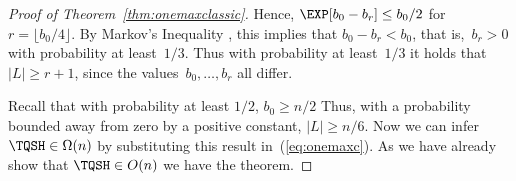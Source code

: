 \begin{proof}[Proof of Theorem~\ref{thm:onemaxclassic}]
Hence, $\EXP[b_0-b_r]\le b_0/2$ for~$r=\lfloor b_0/4\rfloor$. By
Markov's In\-equality \cite{MitzemacherU05}, this implies that
$b_0-b_r<b_0$, that is,~$b_r>0$ with probability at least~$1/3$. Thus
with probability at least~$1/3$ it holds that~$|L|\ge r+1$, since the
values~$b_0,\hdots,b_r$ all differ.

Recall that with probability at least $1/2$, $b_0\ge n/2$ Thus, with a
probability bounded away from zero by a positive constant, $|L|\ge
n/6$. Now we can infer $\TQSH\in\Omega(n)$ by substituting this result
in~(\ref{eq:onemaxc}). As we have already show that $\TQSH\in O(n)$ we
have the theorem.
\end{proof}
